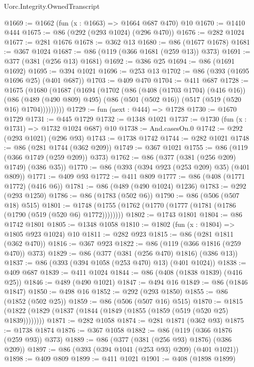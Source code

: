 \begin{lexlean}{Uorc.Integrity.OwnedTranscript}
\begin{coremodule}
@1669 := @1662 (fun (x : @1663) => @1664 @687 @470) @10
@1670 := @1410 @444
@1675 := @86 (@292 (@293 @1024) (@296 @470))
@1676 := @282 @1024
@1677 := @281 @1676
@1678 := @362 @13
@1680 := @86 (@1677 @1678)
@1681 := @367 @1024
@1687 := @86 (@119 (@366 @1681 (@259 @13)) @373)
@1691 := @377 (@381 (@256 @13) @1681)
@1692 := @386 @25
@1694 := @86 (@1691 @1692)
@1695 := @394 @1021
@1696 := @253 @13
@1702 := @86 (@393 (@1695 @1696 @25) (@401 @687))
@1703 := @409 @470
@1704 := @411 @687
@1728 := @1675
    (@1680
      (@1687
        (@1694
          (@1702
            (@86
              (@408 (@1703 @1704) (@416 @16))
              (@86
                (@489 (@490 @809) @495)
                (@86 (@501 (@502 @16)) (@517 (@519 (@520 @16) @1704)))))))))
@1729 := fun (next : @444) => @1728
@1730 := @1670 @1729
@1731 := @445 @1729
@1732 := @1348 @1021
@1737 := @1730 (fun (x : @1731) => @1732 @1024 @687) @10
@1738 := And.casesOn.{0}
@1742 := @292 (@293 @1021) (@296 @93)
@1743 := @1738 @1742
@1744 := @282 @1021
@1748 := @86 (@281 @1744 (@362 @209))
@1749 := @367 @1021
@1755 := @86 (@119 (@366 @1749 (@259 @209)) @373)
@1762 := @86 (@377 (@381 (@256 @209) @1749) (@386 @35))
@1770 := @86 (@393 (@394 @923 (@253 @209) @35) (@401 @809))
@1771 := @409 @93
@1772 := @411 @809
@1777 := @86 (@408 (@1771 @1772) (@416 @6))
@1781 := @86 (@489 (@490 @1024) @1236)
@1783 := @292 (@293 @1250)
@1786 := @86 (@1783 (@502 @6))
@1790 := @86 (@506 (@507 @18) @515)
@1801 := @1748 (@1755 (@1762 (@1770 (@1777 (@1781 (@1786 (@1790 (@519 (@520 @6) @1772))))))))
@1802 := @1743 @1801
@1804 := @86 @1742 @1801
@1805 := @1348 @1058
@1810 := @1802 (fun (x : @1804) => @1805 @923 @1024) @10
@1811 := @282 @923
@1815 := @86 (@281 @1811 (@362 @470))
@1816 := @367 @923
@1822 := @86 (@119 (@366 @1816 (@259 @470)) @373)
@1829 := @86 (@377 (@381 (@256 @470) @1816) (@386 @13))
@1837 := @86 (@393 (@394 @1058 (@253 @470) @13) (@401 @1024))
@1838 := @409 @687
@1839 := @411 @1024
@1844 := @86 (@408 (@1838 @1839) (@416 @25))
@1846 := @489 (@490 @1021)
@1847 := @494 @16
@1849 := @86 (@1846 @1847)
@1850 := @498 @16
@1852 := @292 (@293 @1850)
@1855 := @86 (@1852 (@502 @25))
@1859 := @86 (@506 (@507 @16) @515)
@1870 := @1815 (@1822 (@1829 (@1837 (@1844 (@1849 (@1855 (@1859 (@519 (@520 @25) @1839))))))))
@1871 := @282 @1058
@1874 := @281 @1871 (@362 @93)
@1875 := @1738 @1874
@1876 := @367 @1058
@1882 := @86 (@119 (@366 @1876 (@259 @93)) @373)
@1889 := @86 (@377 (@381 (@256 @93) @1876) (@386 @209))
@1897 := @86 (@393 (@394 @1041 (@253 @93) @209) (@401 @1021))
@1898 := @409 @809
@1899 := @411 @1021
@1901 := @408 (@1898 @1899)

\end{coremodule}
\end{lexlean}
